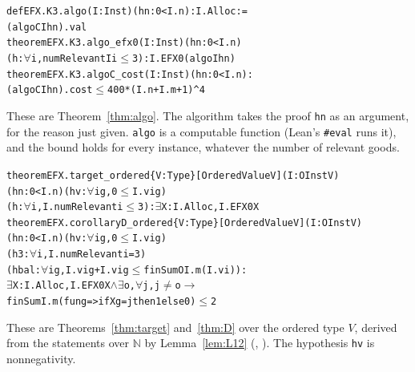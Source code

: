 \documentclass[runningheads,11pt]{llncs}
\begin{document}
\begin{alltt}\small
def EFX.K3.algo (I : Inst) (hn : 0 < I.n) : I.Alloc :=
  (algoC I hn).val
theorem EFX.K3.algo_efx0 (I : Inst) (hn : 0 < I.n)
    (h : \(\forall\) i, numRelevant I i \(\le\) 3) : I.EFX0 (algo I hn)
theorem EFX.K3.algoC_cost (I : Inst) (hn : 0 < I.n) :
    (algoC I hn).cost \(\le\) 400 * (I.n + I.m + 1) ^ 4
\end{alltt}
These are Theorem~\ref{thm:algo}. The algorithm takes the proof \texttt{hn} as an argument, for the reason just given. \texttt{algo} is a computable function (Lean's \texttt{\#eval} runs it), and the bound holds for every instance, whatever the number of relevant goods.

\begin{alltt}\small
theorem EFX.target_ordered \{V : Type\} [OrderedValue V] (I : OInst V)
    (hn : 0 < I.n) (hv : \(\forall\) i g, 0 \(\le\) I.v i g)
    (h : \(\forall\) i, I.numRelevant i \(\le\) 3) : \(\exists\) X : I.Alloc, I.EFX0 X
theorem EFX.corollaryD_ordered \{V : Type\} [OrderedValue V] (I : OInst V)
    (hn : 0 < I.n) (hv : \(\forall\) i g, 0 \(\le\) I.v i g)
    (h3 : \(\forall\) i, I.numRelevant i = 3)
    (hbal : \(\forall\) i g, I.v i g + I.v i g \(\le\) finSumO I.m (I.v i)) :
    \(\exists\) X : I.Alloc, I.EFX0 X \(\wedge\) \(\exists\) o, \(\forall\) j, j \(\ne\) o \(\to\)
      finSum I.m (fun g => if X g = j then 1 else 0) \(\le\) 2
\end{alltt}
These are Theorems~\ref{thm:target} and~\ref{thm:D} over the ordered type $V$, derived from the statements over $\mathbb{N}$ by Lemma~\ref{lem:L12} (, ). The hypothesis \texttt{hv} is nonnegativity.
\end{document}
